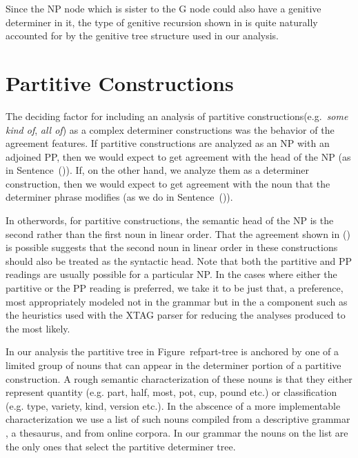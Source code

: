 Since the NP node which is sister
to the G node could also have a genitive determiner in it, the type of
genitive recursion shown in  is quite naturally accounted for
by the genitive tree structure used in our analysis.

\section{Partitive Constructions}

The deciding factor for including an analysis of partitive constructions(e.g.\ {\it some kind
of}, {\it all of\/}) as a complex determiner constructions was the
behavior of the agreement features.  If partitive constructions are analyzed as
an NP with an adjoined PP, then we would expect to get agreement with the head
of the NP (as in Sentence~({})).  If, on the other hand, we analyze them
as a determiner construction, then we would expect to get agreement with the
noun that the determiner phrase modifies (as we do in Sentence~({})).


In otherwords, for partitive constructions, the semantic head of the NP is the second rather than the first noun in linear order. That the agreement shown in ({}) is possible suggests that the second noun in linear order in these constructions should also be treated as the syntactic head. Note that both the partitive and PP readings are usually possible for a particular NP. In the cases where either the partitive or the PP reading is preferred, we take it to be just that, a preference, most appropriately modeled not in the grammar but in the a component such as the heuristics used with the XTAG parser for reducing the analyses produced to the most likely. 

In our analysis the partitive tree in Figure~ref{part-tree} is anchored
by one of a limited group of nouns that can appear in the determiner
portion of a partitive construction. A rough semantic characterization
of these nouns is that they either represent quantity (e.g. part, half,
most, pot, cup, pound etc.) or classification (e.g. type, variety,
kind, version etc.).  In the abscence of a more implementable
characterization we use a list of such nouns compiled from a
descriptive grammar \cite{quirk85}, a thesaurus, and from online
corpora. In our grammar the nouns on the list are the only ones that
select the partitive determiner tree. 


